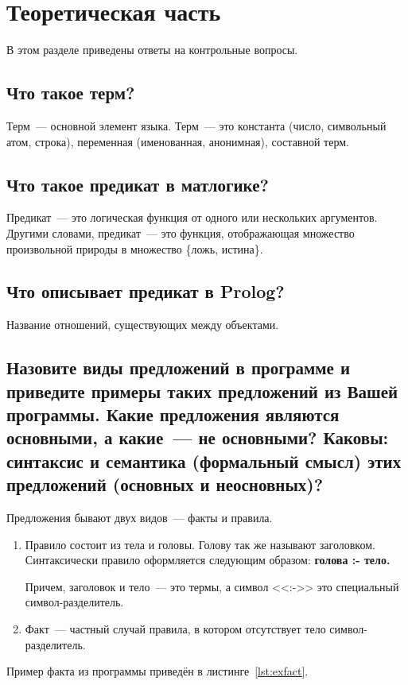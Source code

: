 \chapter{Теоретическая часть}

В этом разделе приведены ответы на контрольные вопросы.

\section{Что такое терм?}
Терм~--- основной элемент языка. Терм~--- это константа (число, символьный атом, строка), переменная (именованная, анонимная), составной терм.

\section{Что такое предикат в матлогике?}
Предикат~--- это логическая функция от одного или нескольких аргументов. Другими словами, предикат~--- это функция, отображающая множество произвольной природы в множество \{ложь, истина\}.

\section{Что описывает предикат в Prolog?}
Название отношений, существующих между объектами.

\section{Назовите виды предложений в программе и приведите примеры таких предложений из Вашей программы. Какие предложения являются основными, а какие~--- не основными? Каковы: синтаксис и семантика (формальный смысл) этих предложений (основных и неосновных)?}
Предложения бывают двух видов~--- факты и правила.
\begin{enumerate}
    \item Правило состоит из тела и головы. Голову так же называют заголовком. Синтаксически правило оформляется следующим образом: \textbf{голова :- тело.}

    Причем, заголовок и тело~--- это термы, а символ <<:->> это специальный символ-разделитель.
    \item Факт~--- частный случай правила, в котором отсутствует тело символ-разделитель.
\end{enumerate}

Пример факта из программы приведён в листинге~\ref{lst:exfact}.
\begin{lstlisting}[caption={Пример факта},label=lst:exfact]
\end{lstlisting}

